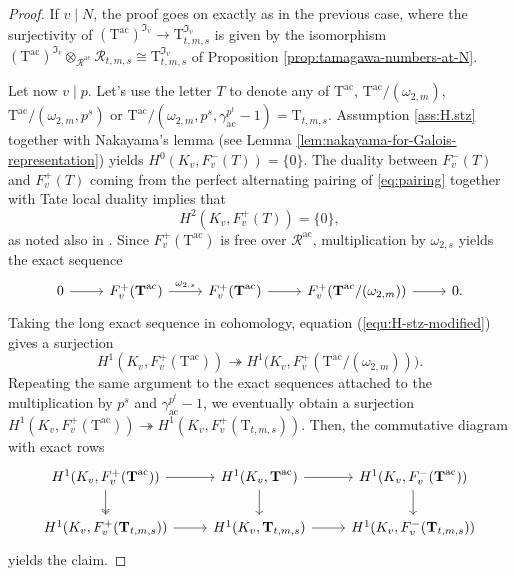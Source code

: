 \documentclass[12pt,reqno]{amsart}
\theoremstyle{definition}
\theoremstyle{remark}
\newcommand{\T}{\boldsymbol{\mathrm{T}}}
\newcommand{\calR}{\mathcal{R}}
\newcommand{\ac}{\mathrm{ac}}
\begin{document}
\begin{proof}
        If $v\mid N$, the proof goes on exactly as in the previous case, where the surjectivity of $(\T^{\ac})^{\mathfrak{I}_v}\to \T_{t,m,s}^{\mathfrak{I}_v}$ is given by the isomorphism $(\T^{\ac})^{\mathfrak{I}_v}\otimes_{\mathcal{R}^{\ac}}\calR_{t,m,s}\cong \T_{t,m,s}^{\mathfrak{I}_v}$ of Proposition \ref{prop:tamagawa-numbers-at-N}.
        
        Let now $v\mid p$.  Let's use the letter $T$ to denote any of $\T^{\ac}$, $\T^{\ac}/(\omega_{2,m})$, $\T^{\ac}/(\omega_{2,m},p^s)$ or $\T^{\ac}/(\omega_{2,m}, p^s, \gamma_{\ac}^{p^t}-1)=\T_{t,m,s}$. Assumption \ref{ass:H.stz} together with Nakayama's lemma (see Lemma \ref{lem:nakayama-for-Galois-representation}) yields $H^0(K_v, F_v^-(T))=\{0\}$. The duality between $F_v^-(T)$ and $F_v^+(T)$ coming from the perfect alternating pairing  of \eqref{eq:pairing} together with Tate local duality implies that
    \begin{equation}
    \label{equ:H-stz-modified}
        H^2(K_v, F_v^+(T))=\{0\},
    \end{equation}
    as noted also in \cite[p. 809]{Buyukboduk:big-Heegner-point-kolyvagin-system}. Since $F_v^+(\T^{\ac})$ is free over $\mathcal{R}^{\ac}$, multiplication by $\omega_{2,s}$ yields the exact sequence 
    \begin{equation*}
        \begin{tikzcd}
	0 & {F_v^+(\T^{\ac})} & {F_v^+(\T^{\ac})} & {F_v^+(\T^{\ac}/(\omega_{2,m}))} & 0.
	\arrow[from=1-1, to=1-2]
	\arrow["{\omega_{2,s}}", from=1-2, to=1-3]
	\arrow[from=1-3, to=1-4]
	\arrow[from=1-4, to=1-5]
        \end{tikzcd}
    \end{equation*}
    Taking the long exact sequence in cohomology, equation (\ref{equ:H-stz-modified}) gives a surjection
    \begin{equation*}
        H^1(K_v,F_v^+(\T^{\ac}))\twoheadrightarrow H^1\big(K_v,F_v^+(\T^{\ac}/(\omega_{2,m}))\big).
    \end{equation*}
    Repeating the same argument to the exact sequences attached to the multiplication by $p^s$ and $\gamma_{\ac}^{p^t}-1$, we eventually obtain a surjection $H^1(K_v,F_v^+(\T^{\ac}))\twoheadrightarrow H^1(K_v,F_v^+(\T_{t,m,s}))$. Then, the commutative diagram with exact rows 
    \begin{equation*}
       \begin{tikzcd}
	{H^1(K_v,F_v^+(\T^{\ac}))} & {H^1(K_v,\T^{\ac})} & {H^1(K_v,F_v^-(\T^{\ac}))} \\
	{H^1(K_v,F_v^+(\T_{t,m,s}))} & {H^1(K_v,\T_{t,m,s})} & {H^1(K_v,F_v^-(\T_{t,m,s}))}
	\arrow[two heads, from=1-1, to=2-1]
	\arrow[from=1-2, to=2-2]
	\arrow[from=1-3, to=2-3]
	\arrow[from=1-1, to=1-2]
	\arrow[from=1-2, to=1-3]
	\arrow[from=2-1, to=2-2]
	\arrow[from=2-2, to=2-3]
\end{tikzcd}
    \end{equation*}
    yields the claim.
\end{proof}
\end{document}
